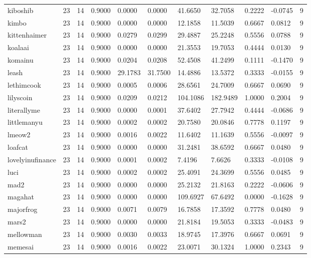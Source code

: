 \begin{table}[htbp]
\begin{tabular}{lllllllllll}
kiboshib & 23 & 14 & 0.9000 & 0.0000 & 0.0000 & 41.6650 & 32.7058 & 0.2222 & -0.0745 & 9 \\
kimbo & 23 & 14 & 0.9000 & 0.0000 & 0.0000 & 12.1858 & 11.5039 & 0.6667 & 0.0812 & 9 \\
kittenhaimer & 23 & 14 & 0.9000 & 0.0279 & 0.0299 & 29.4887 & 25.2248 & 0.5556 & 0.0788 & 9 \\
koalaai & 23 & 14 & 0.9000 & 0.0000 & 0.0000 & 21.3553 & 19.7053 & 0.4444 & 0.0130 & 9 \\
komainu & 23 & 14 & 0.9000 & 0.0204 & 0.0208 & 52.4508 & 41.2499 & 0.1111 & -0.1470 & 9 \\
leash & 23 & 14 & 0.9000 & 29.1783 & 31.7500 & 14.4886 & 13.5372 & 0.3333 & -0.0155 & 9 \\
lethimcook & 23 & 14 & 0.9000 & 0.0005 & 0.0006 & 28.6561 & 24.7009 & 0.6667 & 0.0690 & 9 \\
lilyscoin & 23 & 14 & 0.9000 & 0.0209 & 0.0212 & 104.1086 & 182.9489 & 1.0000 & 0.2004 & 9 \\
literallyme & 23 & 14 & 0.9000 & 0.0000 & 0.0001 & 37.6402 & 27.7942 & 0.4444 & -0.0686 & 9 \\
littlemanyu & 23 & 14 & 0.9000 & 0.0002 & 0.0002 & 20.7580 & 20.0846 & 0.7778 & 0.1197 & 9 \\
lmeow2 & 23 & 14 & 0.9000 & 0.0016 & 0.0022 & 11.6402 & 11.1639 & 0.5556 & -0.0097 & 9 \\
loafcat & 23 & 14 & 0.9000 & 0.0000 & 0.0000 & 31.2481 & 38.6592 & 0.6667 & 0.0480 & 9 \\
lovelyinufinance & 23 & 14 & 0.9000 & 0.0001 & 0.0002 & 7.4196 & 7.6626 & 0.3333 & -0.0108 & 9 \\
luci & 23 & 14 & 0.9000 & 0.0002 & 0.0002 & 25.4091 & 24.3699 & 0.5556 & 0.0485 & 9 \\
mad2 & 23 & 14 & 0.9000 & 0.0000 & 0.0000 & 25.2132 & 21.8163 & 0.2222 & -0.0606 & 9 \\
magahat & 23 & 14 & 0.9000 & 0.0000 & 0.0000 & 109.6927 & 67.6492 & 0.0000 & -0.1628 & 9 \\
majorfrog & 23 & 14 & 0.9000 & 0.0071 & 0.0079 & 16.7858 & 17.3592 & 0.7778 & 0.0480 & 9 \\
mars2 & 23 & 14 & 0.9000 & 0.0000 & 0.0000 & 21.8184 & 19.5053 & 0.3333 & -0.0483 & 9 \\
mellowman & 23 & 14 & 0.9000 & 0.0030 & 0.0033 & 18.9745 & 17.3976 & 0.6667 & 0.0691 & 9 \\
memesai & 23 & 14 & 0.9000 & 0.0016 & 0.0022 & 23.0071 & 30.1324 & 1.0000 & 0.2343 & 9 \\

\end{tabular}
\end{table}
